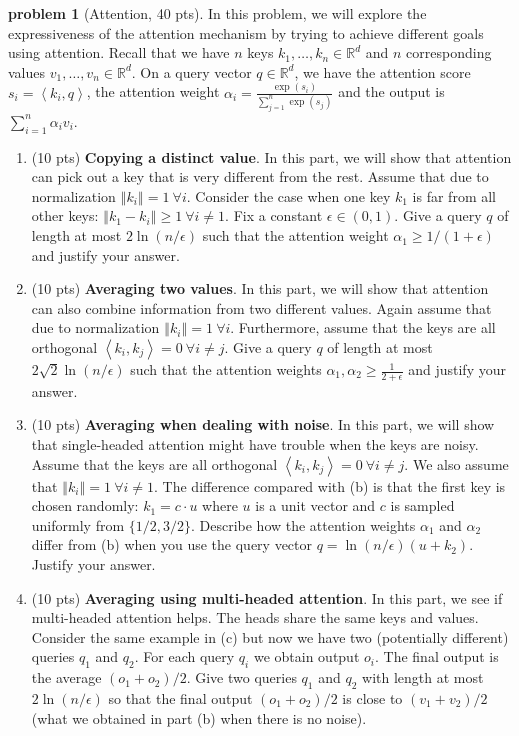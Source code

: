\documentclass[10pt]{article}
\theoremstyle{definition}
\newtheorem{problem}{\sc\color{cit}problem}
\def\R{\mathbb{R}}%
\begin{document}
\begin{problem}[Attention, 40 pts]
In this problem, we will explore the expressiveness of the attention
mechanism by trying to achieve different goals using attention. Recall
that we have $n$ keys $k_{1},\ldots,k_{n}\in\R^{d}$ and $n$ corresponding
values $v_{1},\ldots,v_{n}\in\R^{d}$. On a query vector $q\in\R^{d}$,
we have the attention score $s_{i}=\left\langle k_{i},q\right\rangle $,
the attention weight $\alpha_{i}=\frac{\exp(s_{i})}{\sum_{j=1}^{n}\exp(s_{j})}$
and the output is $\sum_{i=1}^{n}\alpha_{i}v_{i}$.

\begin{enumerate}[label = (\alph*)]
\item (10 pts) \textbf{Copying a distinct value}. In this part, we will show that
attention can pick out a key that is very different from the rest.
Assume that due to normalization $\left\Vert k_{i}\right\Vert =1\ \forall i$.
Consider the case when one key $k_{1}$ is far from all other keys:
$\left\Vert k_{1}-k_{i}\right\Vert \ge1\ \forall i\ne1$. Fix a constant
$\epsilon\in(0,1)$. Give a query $q$ of length at most $2\ln(n/\epsilon)$
such that the attention weight $\alpha_{1}\ge1/(1+\epsilon)$ and
justify your answer.

\item (10 pts)  \textbf{Averaging two values}. In this part, we will show that attention
can also combine information from two different values. Again assume
that due to normalization $\left\Vert k_{i}\right\Vert =1\ \forall i$.
Furthermore, assume that the keys are all orthogonal $\left\langle k_{i},k_{j}\right\rangle =0\ \forall i\ne j$.
Give a query $q$ of length at most $2\sqrt{2}\ln(n/\epsilon)$ such
that the attention weights $\alpha_{1},\alpha_{2}\ge\frac{1}{2+\epsilon}$
and justify your answer.

\item (10 pts) \textbf{Averaging when dealing with noise}. In this part, we will
show that single-headed attention might have trouble when the keys
are noisy. Assume that the keys are all orthogonal $\left\langle k_{i},k_{j}\right\rangle =0\ \forall i\ne j$.
We also assume that $\left\Vert k_{i}\right\Vert =1\ \forall i\ne1$.
The difference compared with (b) is that the first key is chosen randomly:
$k_{1}=c\cdot u$ where $u$ is a unit vector and $c$ is sampled
uniformly from $\{1/2,3/2\}$. Describe how the attention weights
$\alpha_{1}$ and $\alpha_{2}$ differ from (b) when you use the query
vector $q=\ln(n/\epsilon)(u+k_{2})$. Justify your answer.

\item (10 pts) \textbf{Averaging using multi-headed attention}. In this part, we
see if multi-headed attention helps. The heads share the same keys
and values. Consider the same example in (c) but now we have two (potentially
different) queries $q_{1}$ and $q_{2}$. For each query $q_{i}$
we obtain output $o_{i}$. The final output is the average $(o_{1}+o_{2})/2$.
Give two queries $q_{1}$ and $q_{2}$ with length at most $2\ln(n/\epsilon)$
so that the final output $(o_{1}+o_{2})/2$ is close to $(v_{1}+v_{2})/2$
(what we obtained in part (b) when there is no noise).
\end{enumerate}
\end{problem}
\end{document}
